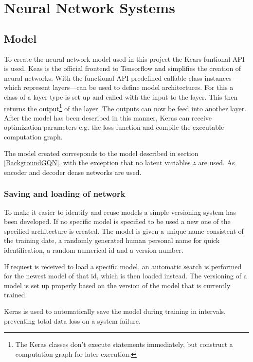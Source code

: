 
\chapter{Neural Network Systems}
\section{Model}
{To create the neural network model used in this project the Kears funtional API is used. Keas is the official frontend to Tensorflow and simplifies the creation of neural networks. With the functional API predefined callable class instances---which represent layers---can be used to define model architectures. For this a class of a layer type is set up and called with the input to the layer. This then returns the output\footnote{The Keras classes don't execute statements immediately, but construct a computation graph for later execution.} of the layer. The outputs can now be feed into another layer. After the model has been described in this manner, Keras can receive optimization parameters e.g. the loss function and compile the executable computation graph.}

The model created corresponds to the model described in section \ref{BackgroundGQN}, with the exception that no latent variables $z$ are used. As encoder and decoder dense networks are used.



\subsection{Saving and loading of network}
To make it easier to identify and reuse models a simple versioning system has been developed. If no specific model is specified to be used a new one of the specified architecture is created. The model is given a unique name consistent of the training date, a randomly generated human personal name for quick identification, a random numerical id and a version number.

If request is received to load a specific model, an automatic search is performed for the newest model of that id, which is then loaded instead. The versioning of a model is set up properly based on the version of the model that is currently trained.

Keras is used to automatically save the model during training in intervals, preventing total data loss on a system failure.


